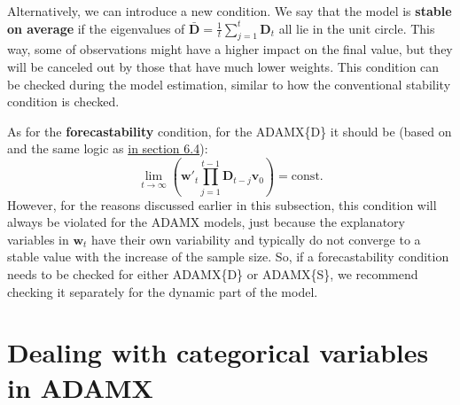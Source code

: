 \documentclass[
]{book}
\theoremstyle{definition}
\theoremstyle{definition}
\theoremstyle{definition}
\theoremstyle{definition}
\theoremstyle{remark}
\begin{document}
Alternatively, we can introduce a new condition. We say that the model is \textbf{stable on average} if the eigenvalues of \(\mathbf{\bar{D}}=\frac{1}{t}\sum_{j=1}^t\mathbf{D}_t\) all lie in the unit circle. This way, some of observations might have a higher impact on the final value, but they will be canceled out by those that have much lower weights. This condition can be checked during the model estimation, similar to how the conventional stability condition is checked.

As for the \textbf{forecastability} condition, for the ADAMX\{D\} it should be (based on and the same logic as \protect\hyperlink{stabilityConditionAdditiveError}{in section 6.4}):
\begin{equation}
  \lim\limits_{t\rightarrow\infty}\left(\mathbf{w}'_{t}\prod_{j=1}^{t-1}\mathbf{D}_{t-j} \mathbf{v}_{0}\right) = \text{const} .
  \label{eq:ADAMETSXPureAdditiveDynamicNonSeasonalBackForecastability}
\end{equation}
However, for the reasons discussed earlier in this subsection, this condition will always be violated for the ADAMX models, just because the explanatory variables in \(\mathbf{w}_{t}\) have their own variability and typically do not converge to a stable value with the increase of the sample size. So, if a forecastability condition needs to be checked for either ADAMX\{D\} or ADAMX\{S\}, we recommend checking it separately for the dynamic part of the model.

\hypertarget{ETSXDynamicCategories}{%
\section{Dealing with categorical variables in ADAMX}\label{ETSXDynamicCategories}}
\end{document}
